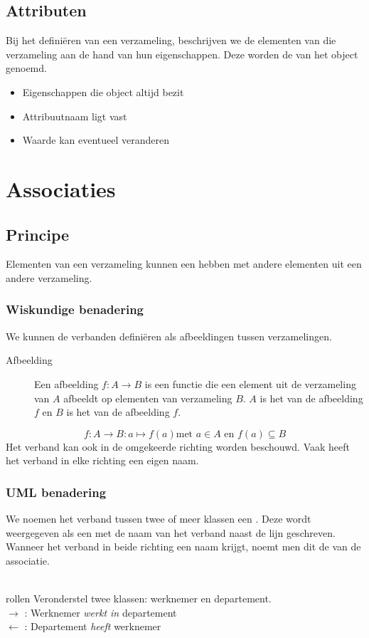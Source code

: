 \documentclass[../main.tex]{subfiles}
\begin{document}
\subsection{Attributen}
Bij het defini\"eren van een verzameling, beschrijven we de elementen van die verzameling aan de hand van hun eigenschappen. Deze worden de  van het object genoemd.
\begin{itemize}
	\item Eigenschappen die object altijd bezit
	\item Attribuutnaam ligt vast
	\item Waarde kan eventueel veranderen
\end{itemize}
\section{Associaties}
\subsection{Principe}
Elementen van een verzameling kunnen een  hebben met andere elementen uit een andere verzameling.
\subsubsection{Wiskundige benadering}
We kunnen de verbanden defini\"eren als afbeeldingen tussen verzamelingen.
\begin{description}
	\item[Afbeelding]  Een afbeelding $f : A \rightarrow B$ is een functie die een element uit de verzameling van $A$ afbeeldt op elementen van verzameling $B$. $A$ is het  van de afbeelding $f$ en $B$ is het  van de afbeelding $f$.
\end{description}

\begin{equation*}
f: A \rightarrow B:a \mapsto f(a) \textrm{met } a \in A \textrm{ en } f(a) \subseteq B
\end{equation*}
Het verband kan ook in de omgekeerde richting worden beschouwd. Vaak heeft het verband in elke richting een eigen naam.
\subsubsection{UML benadering}
We noemen het verband tussen twee of meer klassen een . Deze wordt weergegeven als een  met de naam van het verband naast de lijn geschreven. Wanneer het verband in beide richting een naam krijgt, noemt men dit de  van de associatie.
\\\\
\begin{ex}{rollen}
Veronderstel twee klassen: werknemer en departement. \\
$\rightarrow$ : Werknemer \textit{werkt in} departement \\
$\leftarrow$ : Departement \textit{heeft} werknemer
\end{ex}
\end{document}
